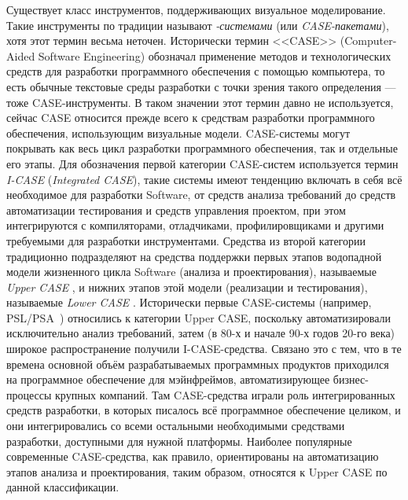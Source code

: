 Существует класс инструментов, поддерживающих визуальное моделирование. 
Такие инструменты по традиции называют \textit{-системами} (или \textit{\ac{CASE}-пакетами}), 
хотя этот термин весьма неточен. Исторически термин <<\ac{CASE}>>
(Computer-Aided Software Engineering) обозначал применение методов и 
технологических средств для разработки программного обеспечения с помощью 
компьютера, то есть обычные текстовые среды разработки с точки зрения такого 
определения --- тоже \ac{CASE}-инструменты. В таком значении этот термин давно 
не используется, сейчас \ac{CASE} относится прежде всего к средствам разработки 
программного обеспечения, использующим визуальные модели. \ac{CASE}-системы могут 
покрывать как весь цикл разработки программного обеспечения, так и отдельные 
его этапы. Для обозначения первой категории \ac{CASE}-систем используется термин 
\textit{I-CASE}
(\textit{Integrated CASE}), такие системы имеют тенденцию включать в себя всё 
необходимое для разработки \ac{Software}, от средств анализа требований до средств 
автоматизации тестирования и средств управления проектом, при этом интегрируются 
с компиляторами, отладчиками, профилировщиками и другими требуемыми для 
разработки инструментами. Средства из второй категории традиционно подразделяют 
на средства поддержки первых этапов водопадной модели жизненного цикла \ac{Software} 
(анализа и проектирования), называемые \textit{Upper CASE}%
, и нижних этапов этой модели 
(реализации и тестирования), называемые \textit{Lower CASE}%
. Исторически первые \ac{CASE}-системы (например, PSL/PSA~\cite{teichroew1977psl}) относились к категории Upper CASE, поскольку 
автоматизировали исключительно анализ требований, затем 
(в 80-х и начале 90-х годов 20-го века) широкое распространение получили 
I-CASE-средства. Связано это с тем, что в те времена основной объём 
разрабатываемых программных продуктов приходился на программное обеспечение для 
мэйнфреймов, автоматизирующее бизнес-процессы крупных компаний. Там 
\ac{CASE}-средства играли роль интегрированных средств разработки, в которых 
писалось всё программное обеспечение целиком, и они интегрировались со всеми 
остальными необходимыми средствами разработки, доступными для нужной платформы. 
Наиболее популярные современные \ac{CASE}-средства, как правило, ориентированы на 
автоматизацию этапов анализа и проектирования, таким образом, относятся к 
Upper CASE по данной классификации.

